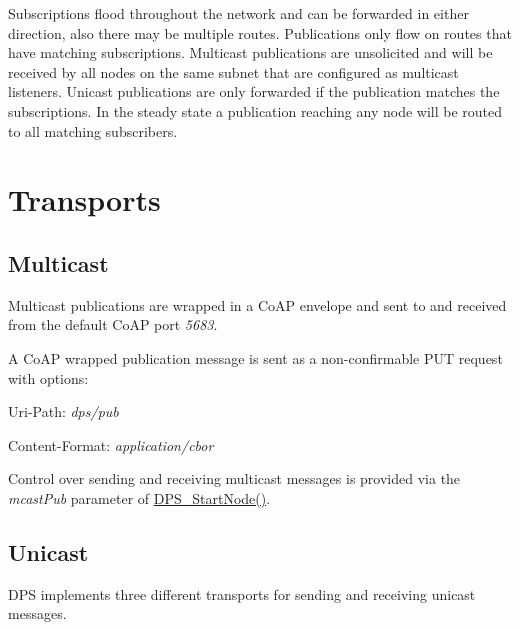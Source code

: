 Subscriptions flood throughout the network and can be forwarded in either direction, also there may be multiple routes. Publications only flow on routes that have matching subscriptions. Multicast publications are unsolicited and will be received by all nodes on the same subnet that are configured as multicast listeners. Unicast publications are only forwarded if the publication matches the subscriptions. In the steady state a publication reaching any node will be routed to all matching subscribers.\hypertarget{mesh-network_message-transports}{}\section{Transports}\label{mesh-network_message-transports}
\hypertarget{mesh-network_Multicast}{}\subsection{Multicast}\label{mesh-network_Multicast}
Multicast publications are wrapped in a Co\+AP envelope and sent to and received from the default Co\+AP port {\itshape 5683}.

A Co\+AP wrapped publication message is sent as a non-\/confirmable P\+UT request with options\+:
\begin{DoxyItemize}
\item Uri-\/\+Path\+: {\itshape dps/pub} 
\item Content-\/\+Format\+: {\itshape application/cbor} 
\end{DoxyItemize}

Control over sending and receiving multicast messages is provided via the {\itshape mcast\+Pub} parameter of \hyperlink{group__node_ga160d504bfaeb0d3711e0259000340fe3}{D\+P\+S\+\_\+\+Start\+Node()}.\hypertarget{mesh-network_Unicast}{}\subsection{Unicast}\label{mesh-network_Unicast}
D\+PS implements three different transports for sending and receiving unicast messages.

